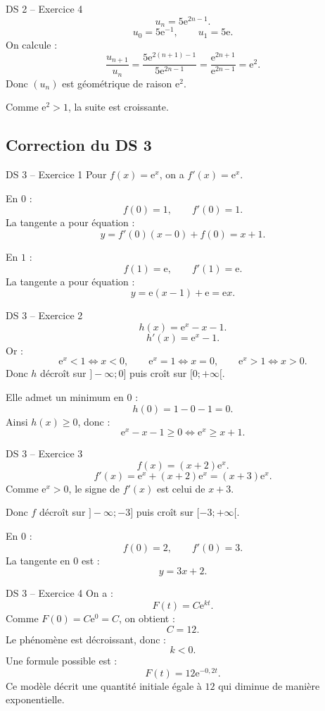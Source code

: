\documentclass[11pt,a4paper]{article}
\newcommand{\e}{\mathrm{e}}
\begin{document}
\begin{correctionbox}{DS 2 -- Exercice 4}
\[
u_n=5\e^{2n-1}.
\]
\[
u_0=5\e^{-1},
\qquad
u_1=5\e.
\]
On calcule :
\[
\frac{u_{n+1}}{u_n}
=
\frac{5\e^{2(n+1)-1}}{5\e^{2n-1}}
=
\frac{\e^{2n+1}}{\e^{2n-1}}
=
\e^2.
\]
Donc $(u_n)$ est géométrique de raison $\e^2$.

Comme $\e^2>1$, la suite est croissante.
\end{correctionbox}

\subsection{Correction du DS 3}

\begin{correctionbox}{DS 3 -- Exercice 1}
Pour $f(x)=\e^x$, on a $f'(x)=\e^x$.

En $0$ :
\[
f(0)=1,
\qquad
f'(0)=1.
\]
La tangente a pour équation :
\[
y=f'(0)(x-0)+f(0)=x+1.
\]

En $1$ :
\[
f(1)=\e,
\qquad
f'(1)=\e.
\]
La tangente a pour équation :
\[
y=\e(x-1)+\e=\e x.
\]
\end{correctionbox}

\begin{correctionbox}{DS 3 -- Exercice 2}
\[
h(x)=\e^x-x-1.
\]
\[
h'(x)=\e^x-1.
\]
Or :
\[
\e^x<1 \Longleftrightarrow x<0,
\qquad
\e^x=1 \Longleftrightarrow x=0,
\qquad
\e^x>1 \Longleftrightarrow x>0.
\]
Donc $h$ décroît sur $]-\infty;0]$ puis croît sur $[0;+\infty[$.

Elle admet un minimum en $0$ :
\[
h(0)=1-0-1=0.
\]
Ainsi $h(x)\geq0$, donc :
\[
\e^x-x-1\geq0
\Longleftrightarrow
\e^x\geq x+1.
\]
\end{correctionbox}

\begin{correctionbox}{DS 3 -- Exercice 3}
\[
f(x)=(x+2)\e^x.
\]
\[
f'(x)=\e^x+(x+2)\e^x=(x+3)\e^x.
\]
Comme $\e^x>0$, le signe de $f'(x)$ est celui de $x+3$.

Donc $f$ décroît sur $]-\infty;-3]$ puis croît sur $[-3;+\infty[$.

En $0$ :
\[
f(0)=2,
\qquad
f'(0)=3.
\]
La tangente en $0$ est :
\[
y=3x+2.
\]
\end{correctionbox}

\begin{correctionbox}{DS 3 -- Exercice 4}
On a :
\[
F(t)=C\e^{kt}.
\]
Comme $F(0)=C\e^0=C$, on obtient :
\[
C=12.
\]
Le phénomène est décroissant, donc :
\[
k<0.
\]
Une formule possible est :
\[
F(t)=12\e^{-0,2t}.
\]
Ce modèle décrit une quantité initiale égale à $12$ qui diminue de manière exponentielle.
\end{correctionbox}
\end{document}
